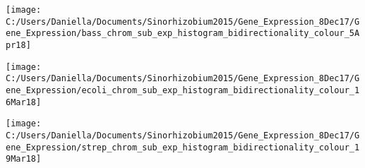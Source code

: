 \documentclass[12pt]{article}
\newcommand{\smel}{\textit{S.\,meliloti}\xspace}
\newcommand{\strep}{\textit{Streptomyces}\xspace}
\newcommand{\bass}{\textit{B.\,subtilis}\xspace}
\newcommand{\ecol}{\textit{E.\,coli}\xspace}
\providecommand{\e}[1]{\ensuremath{\times 10^{#1}}}
\begin{document}
\texttt{[image: C:/Users/Daniella/Documents/Sinorhizobium2015/Gene\_Expression\_8Dec17/Gene\_Expression/bass\_chrom\_sub\_exp\_histogram\_bidirectionality\_colour\_5Apr18]}

\texttt{[image: C:/Users/Daniella/Documents/Sinorhizobium2015/Gene\_Expression\_8Dec17/Gene\_Expression/ecoli\_chrom\_sub\_exp\_histogram\_bidirectionality\_colour\_16Mar18]}

\texttt{[image: C:/Users/Daniella/Documents/Sinorhizobium2015/Gene\_Expression\_8Dec17/Gene\_Expression/strep\_chrom\_sub\_exp\_histogram\_bidirectionality\_colour\_19Mar18]}

%		
\end{document}
